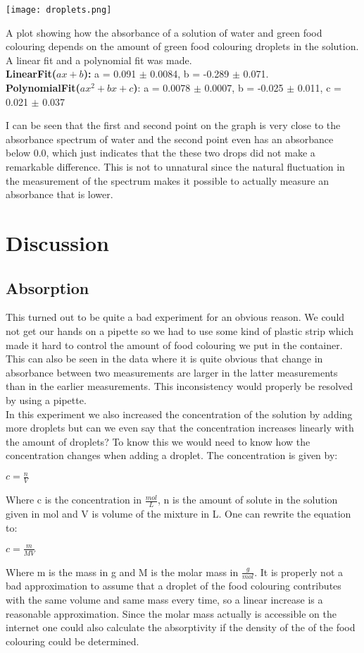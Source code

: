 \documentclass[working, oneside]{inputs/tuftebook}
\begin{document}
\begin{marginfigure}
\centering
\texttt{[image: droplets.png]}
\caption{A plot showing how the absorbance of a solution of water and green food colouring depends on the amount of green food colouring droplets in the solution. A linear fit and a polynomial fit was made.\\ 
\textbf{LinearFit($ax+b$):} a = 0.091 $\pm$ 0.0084, b = -0.289 $\pm$ 0.071. \\
\textbf{PolynomialFit($ax^2 + bx +c$)}: a = 0.0078 $\pm$ 0.0007, b = -0.025 $\pm$ 0.011, c = 0.021 $\pm$ 0.037}
\end{marginfigure}
I can be seen that the first and second point on the graph is very close to the absorbance spectrum of water and the second point even has an absorbance below 0.0, which just indicates that the these two drops did not make a remarkable difference. This is not to unnatural since the natural fluctuation in the measurement of the spectrum makes it possible to actually measure an absorbance that is lower.


\section*{Discussion}
\subsection*{Absorption}
This turned out to be quite a bad experiment for an obvious reason. We could not get our hands on a pipette so we had to use some kind of plastic strip which made it hard to control the amount of food colouring we put in the container. This can also be seen in the data where it is quite obvious that change in absorbance between two measurements are larger in the latter measurements than in the earlier measurements. This inconsistency would properly be resolved by using a pipette.  \\

In this experiment we also increased the concentration of the solution by adding more droplets but can we even say that the concentration increases linearly with the amount of droplets? To know this we would need to know how the concentration changes when adding a droplet. The concentration is given by:
\begin{center}
$c = \frac{n}{V}$
\end{center}
Where c is the concentration in $\frac{mol}{L}$, n is the amount of solute in the solution given in mol and V is volume of the mixture in L. One can rewrite the equation to:
\begin{center}
$c = \frac{m}{MV}$
\end{center}
Where m is the mass in g and M is the molar mass in $\frac{g}{mol}$. It is properly not a bad approximation to assume that a droplet of the food colouring contributes with the same volume and same mass every time, so a linear increase is a reasonable approximation. Since the molar mass actually is accessible on the internet one could also calculate the absorptivity if the density of the of the food colouring could be determined. \\
\end{document}
